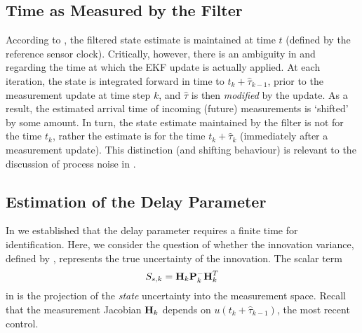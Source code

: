 \documentclass[letterpaper,10pt,conference]{ieeeconf}
\theoremstyle{definition}
\begin{document}
\subsection{Time as Measured by the Filter}
\label{subsec:update_time}

According to , the filtered state estimate is maintained at time $t$ (defined by the reference sensor clock).
%
Critically, however, there is an ambiguity in  and  regarding the time at which the EKF update is actually applied.
%
At each iteration, the state is integrated forward in time to $t_{k} + \hat{\tau}_{k - 1}$, prior to the measurement update at time step $k$, and $\hat{\tau}$ is then \emph{modified} by the update.
%
As a result, the estimated arrival time of incoming (future) measurements is `shifted' by some amount. In turn, the state estimate maintained by the filter is not for the time $t_{k}$, rather the estimate is for the time $t_{k} + \hat{\tau}_{k}$ (immediately after a measurement update).
%
This distinction (and shifting behaviour) is relevant to the discussion of process noise in .

\subsection{Estimation of the Delay Parameter}
\label{subsec:delay_estimate}

In  we established that the delay parameter requires a finite time for identification.
%
Here, we consider the question of whether the innovation variance, defined by , represents the true uncertainty of the innovation.
%
The scalar term
%
\begin{equation}
\label{eqn:state_innovation_variance}
S_{s, k} = \boldsymbol{\mathbf{H}}_{k}\boldsymbol{\mathbf{P}}_{k}^{-}\boldsymbol{\mathbf{H}}_{k}^{T}
\end{equation}
%
in  is the projection of the \emph{state} uncertainty into the measurement space.
%
Recall that the measurement Jacobian $\boldsymbol{\mathbf{H}}_{k}$ depends on $u(t_{k} + \hat{\tau}_{k - 1})$, the most recent control.%
\end{document}
